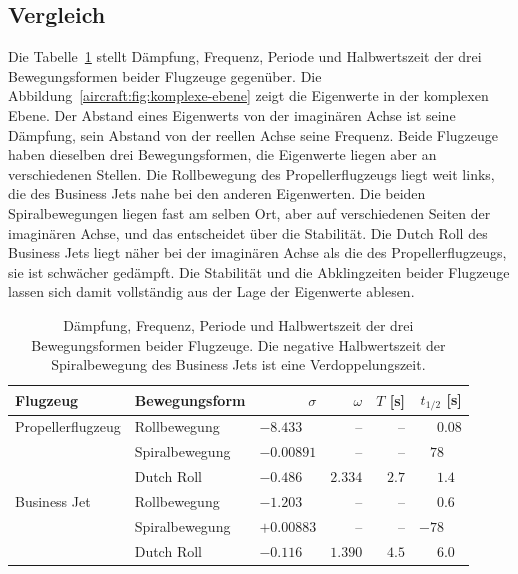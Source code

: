 \subsection{Vergleich
\label{aircraft:subsection:vergleich}}
Die Tabelle~\ref{aircraft:table:vergleich} stellt Dämpfung, Frequenz,
Periode und Halbwertszeit der drei Bewegungsformen beider Flugzeuge
gegenüber.
Die Abbildung~\ref{aircraft:fig:komplexe-ebene} zeigt die Eigenwerte in der
komplexen Ebene.
Der Abstand eines Eigenwerts von der imaginären Achse ist seine Dämpfung,
sein Abstand von der reellen Achse seine Frequenz.
Beide Flugzeuge haben dieselben drei Bewegungsformen, die Eigenwerte liegen
aber an verschiedenen Stellen.
Die Rollbewegung des Propellerflugzeugs liegt weit links, die des Business
Jets nahe bei den anderen Eigenwerten.
Die beiden Spiralbewegungen liegen fast am selben Ort, aber auf
verschiedenen Seiten der imaginären Achse, und das entscheidet über die
Stabilität.
Die Dutch Roll des Business Jets liegt näher bei der imaginären Achse als
die des Propellerflugzeugs, sie ist schwächer gedämpft.
Die Stabilität und die Abklingzeiten beider Flugzeuge lassen sich damit
vollständig aus der Lage der Eigenwerte ablesen.

\begin{table}
    \centering
    \begin{tabular}{llrrrr}
        \hline
        Flugzeug & Bewegungsform
        & $\sigma$ & $\omega$ & $T$ [s] & $t_{1/2}$ [s] \\
        \hline
        Propellerflugzeug & Rollbewegung
        & $-8.433\phantom{00}$           & --      & --    & $0.08$ \\
        & Spiralbewegung
        & $-0.00891$         & --      & --    & $78\phantom{.00}$   \\
        & Dutch Roll
        & $-0.486\phantom{00}$           & $2.334$ & $2.7$ & $1.4\phantom{0}$  \\
        \hline
        Business Jet      & Rollbewegung
        & $-1.203\phantom{00}$           & --      & --    & $0.6\phantom{0}$  \\
        & Spiralbewegung
        & $+0.00883$         & --      & --    & $-78\phantom{.00}$  \\
        & Dutch Roll
        & $-0.116\phantom{00}$           & $1.390$ & $4.5$ & $6.0\phantom{0}$  \\
        \hline
    \end{tabular}
    \caption{Dämpfung, Frequenz, Periode und Halbwertszeit der drei
    Bewegungsformen beider Flugzeuge.
    Die negative Halbwertszeit der Spiralbewegung des Business Jets ist eine
    Verdoppelungszeit.
    \label{aircraft:table:vergleich}}
\end{table}



